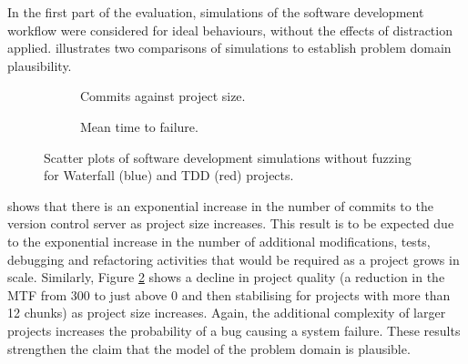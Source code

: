 \documentclass{llncs}
\begin{document}
In the first part of the evaluation, simulations of the software development workflow were considered for ideal
behaviours, without the effects of distraction applied.   illustrates two comparisons of
simulations to establish problem domain plausibility.  %
\begin{figure}[t]
  \centering

  \hfill
  \begin{subfigure}{2.3in}
    \caption{Commits against project size.}
    \label{fig:no-fuzzing:features}
  \end{subfigure}
  \hfill
  \begin{subfigure}{2.3in}
    \caption{Mean time to failure.}  
    \label{fig:no-fuzzing:mtf}
  \end{subfigure}
  \hfill

  \caption{Scatter plots of software development simulations without fuzzing for Waterfall (blue) and TDD (red)
    projects.}
  \label{fig:no-fuzzing}
\end{figure}
shows that there is an exponential increase in the number of commits to the version control server as project size
increases.  This result is to be expected due to the exponential increase in the number of additional modifications,
tests, debugging and refactoring activities that would be required as a project grows in scale.  Similarly, Figure
\ref{fig:no-fuzzing:mtf} shows a decline in project quality (a reduction in the MTF from 300 to just above 0 and then
stabilising for projects with more than 12 chunks) as project size increases.  Again, the additional complexity of
larger projects increases the probability of a bug causing a system failure.
These results strengthen the claim that the model of the problem domain is plausible.
\end{document}
